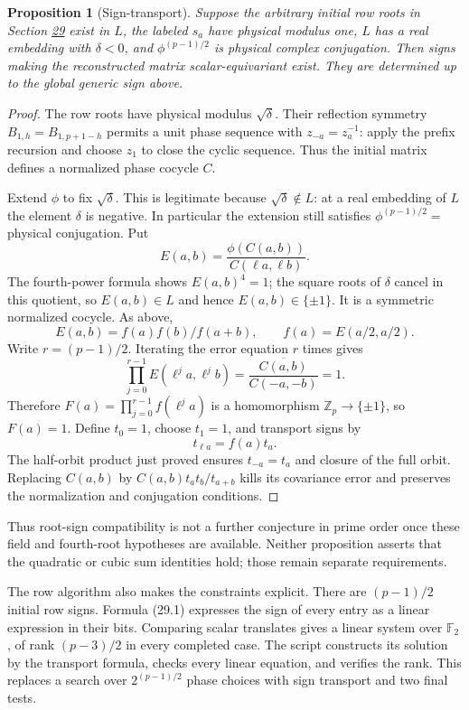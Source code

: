 \documentclass[11pt,reqno]{amsart}
\theoremstyle{plain}
\newtheorem{proposition}[theorem]{Proposition}
\begin{document}
\begin{proposition}[Sign-transport]
Suppose the arbitrary initial row
roots in Section \hyperref[sec:29]{29} exist in \(L\), the labeled \(s_a\) have physical
modulus one, \(L\) has a real embedding with \(\delta<0\), and
\(\phi^{(p-1)/2}\) is physical complex conjugation.
Then signs making the reconstructed matrix scalar-equivariant exist.
They are determined up to the global generic sign above.
\end{proposition}

\begin{proof}
The row roots have physical modulus \(\sqrt\delta\).
Their reflection symmetry \(B_{1,h}=B_{1,p+1-h}\) permits a unit
phase sequence with \(z_{-a}=z_a^{-1}\): apply the prefix recursion
and choose \(z_1\) to close the cyclic sequence. Thus the initial
matrix defines a normalized phase cocycle \(C\).

Extend \(\phi\) to fix \(\sqrt\delta\). This is legitimate because
\(\sqrt\delta\notin L\): at a real embedding of \(L\) the element
\(\delta\) is negative. In particular the extension still satisfies
\(\phi^{(p-1)/2}=\) physical conjugation. Put
\[
 E(a,b)=\frac{\phi(C(a,b))}{C(\ell a,\ell b)}.
\]
The fourth-power formula shows \(E(a,b)^4=1\); the square roots of
\(\delta\) cancel in this quotient, so \(E(a,b)\in L\) and hence
\(E(a,b)\in\{\pm1\}\). It is a symmetric normalized cocycle.
As above,
\[
 E(a,b)=f(a)f(b)/f(a+b),\qquad f(a)=E(a/2,a/2).
\]
Write \(r=(p-1)/2\). Iterating the error equation \(r\) times gives
\[
 \prod_{j=0}^{r-1}E(\ell^j a,\ell^j b)
 =\frac{\overline{C(a,b)}}{C(-a,-b)}=1.
\]
Therefore \(F(a)=\prod_{j=0}^{r-1}f(\ell^j a)\) is a homomorphism
\(\mathbb Z_p\to\{\pm1\}\), so \(F(a)=1\).
Define \(t_0=1\), choose \(t_1=1\), and transport signs by
\[
 \boxed{t_{\ell a}=f(a)t_a.}
\]
The half-orbit product just proved ensures \(t_{-a}=t_a\) and
closure of the full orbit. Replacing \(C(a,b)\) by
\(C(a,b)t_at_b/t_{a+b}\) kills its covariance error and preserves
the normalization and conjugation conditions.
\end{proof}

Thus root-sign compatibility is not a further conjecture in prime
order once these field and fourth-root hypotheses are available.
Neither proposition asserts that the quadratic or cubic sum
identities hold; those remain separate requirements.

The row algorithm also makes the constraints explicit. There are
\((p-1)/2\) initial row signs. Formula (29.1) expresses the sign of
every entry as a linear expression in their bits. Comparing scalar
translates gives a linear system over \(\mathbb F_2\), of rank
\((p-3)/2\) in every completed case. The script constructs its
solution by the transport formula, checks every linear equation,
and verifies the rank. This replaces a search over
\(2^{(p-1)/2}\) phase choices with sign transport and two final tests.
\end{document}
